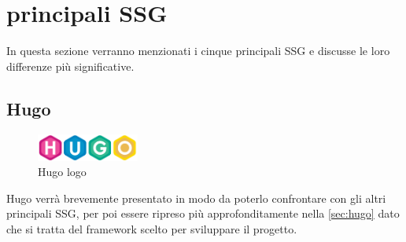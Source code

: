 \documentclass[target=bach,aauheader=]{thud}
\begin{document}
\section{principali SSG}
In questa sezione verranno menzionati i cinque principali SSG e discusse le loro differenze più significative. 

\subsection{Hugo}\label{subsec:shugo}
\begin{figure}
    \centering
    \includegraphics[width = 0.3\textwidth]{images/Hugo_logo.png}
    \caption{Hugo logo}
\end{figure}

Hugo verrà brevemente presentato in modo da poterlo confrontare con gli altri principali SSG, per poi essere ripreso più approfonditamente nella \cref{sec:hugo} dato che si tratta del framework scelto per sviluppare il progetto.
\end{document}
